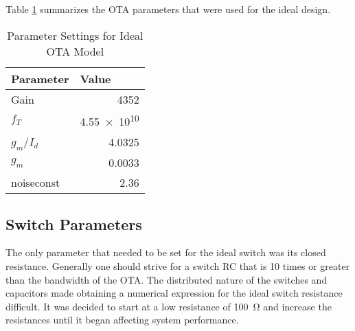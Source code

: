 Table \ref{tab:otasetparams} summarizes the OTA parameters that were used for the ideal design.
\begin{table}[htbp]
\renewcommand*\arraystretch{1.3}
\centering
\begin{tabular}{|l|r|}
\hline
Parameter & \multicolumn{1}{l|}{Value} \\ \hline
Gain & 4352 \\ \hline
$f_{T}$ & \num{4.55e10} \\ \hline
$g_{m}$/$I_{d}$ & 4.0325 \\ \hline
$g_{m}$ & 0.0033 \\ \hline
noiseconst & 2.36 \\ \hline
\end{tabular}
\caption{Parameter Settings for Ideal OTA Model}
\label{tab:otasetparams}
\end{table}
\subsection{Switch Parameters}
The only parameter that needed to be set for the ideal switch was its closed resistance. Generally one should strive for a switch RC that is 10 times or greater than the bandwidth of the OTA. The distributed nature of the switches and capacitors made obtaining a numerical expression for the ideal switch resistance difficult. It was decided to start at a low resistance of \SI{100}{\ohm} and increase the resistances until it began affecting system performance.
